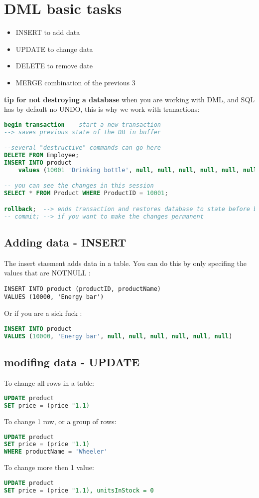 \documentclass{report}
\begin{document}
	\section{DML basic tasks}
	\begin{itemize}
		\item INSERT to add data
		\item UPDATE to change data
		\item DELETE to remove date
		\item MERGE combination of the previous 3
	\end{itemize}

	\textbf{tip for not destroying a database}
	when you are working with DML, and SQL has by default no UNDO, this is why we work with tranactions: 
	\begin{lstlisting}[language=SQL]
begin transaction -- start a new transaction
--> saves previous state of the DB in buffer

--several "destructive" commands can go here
DELETE FROM Employee;
INSERT INTO product
	values (10001 'Drinking bottle', null, null, null, null, null, null);

-- you can see the changes in this session
SELECT * FROM Product WHERE ProductID = 10001;

rollback;  --> ends transaction and restores database to state before begin transaction
-- commit; --> if you want to make the changes permanent\end{lstlisting}
	\subsection{Adding data - INSERT}
	The insert staement adds data in a table. You can do this by only specifing the values that are NOTNULL : 
	\begin{lstlisting}
INSERT INTO product (productID, productName)
VALUES (10000, 'Energy bar')\end{lstlisting}
	Or if you are a sick fuck : 
	\begin{lstlisting}[language=SQL]
INSERT INTO product
VALUES (10000, 'Energy bar', null, null, null, null, null, null)\end{lstlisting}
\pagebreak
	\subsection{modifing data - UPDATE}
	To change all rows in a table: 
	\begin{lstlisting}[language=SQL]
UPDATE product
SET price = (price "1.1)\end{lstlisting}
To change 1 row, or a group of rows:  
\begin{lstlisting}[language=SQL]
UPDATE product
SET price = (price "1.1)
WHERE productName = 'Wheeler'\end{lstlisting}
To change more then 1 value: 
\begin{lstlisting}[language=SQL]
UPDATE product
SET price = (price "1.1), unitsInStock = 0\end{lstlisting}
\end{document}

